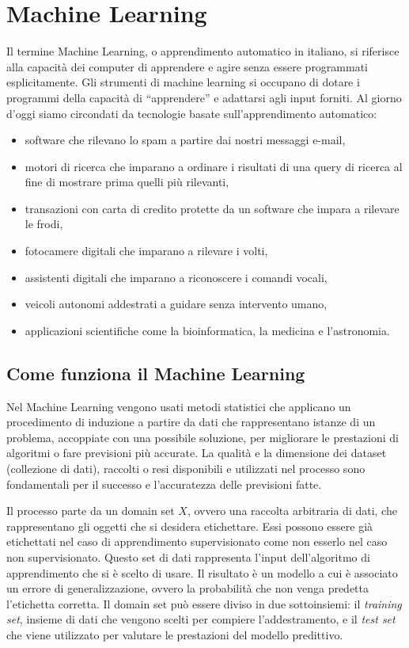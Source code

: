 \documentclass[12pt,italian]{report}
\begin{document}
\chapter{Machine Learning}
Il termine Machine Learning, o apprendimento automatico in italiano, si riferisce alla capacità dei computer di apprendere e agire senza essere programmati esplicitamente.
Gli strumenti di machine learning si occupano di dotare i programmi della capacità di ``apprendere'' e adattarsi agli input forniti.
Al giorno d'oggi siamo circondati da tecnologie basate sull'apprendimento automatico:
\begin{itemize}
	\item software che rilevano lo spam a partire dai nostri messaggi e-mail, 
	\item motori di ricerca che imparano a ordinare i risultati di una query di ricerca al fine di mostrare prima quelli più rilevanti, 
	\item transazioni con carta di credito protette da un software che impara a rilevare le frodi, 
	\item fotocamere digitali che imparano a rilevare i volti, 
	\item assistenti digitali che imparano a riconoscere i comandi vocali, 
	\item veicoli autonomi addestrati a guidare senza intervento umano, 
	\item applicazioni scientifiche come la bioinformatica, la medicina e l'astronomia.
\end{itemize}
\section{Come funziona il Machine Learning}
\label{sec:Come funziona il Machine Learning}
Nel Machine Learning vengono usati metodi statistici che applicano un procedimento di induzione a partire da dati che rappresentano istanze di un problema, accoppiate con una possibile soluzione, per migliorare le prestazioni di algoritmi o fare previsioni più accurate.
La qualità e la dimensione dei dataset (collezione di dati), raccolti o resi disponibili e utilizzati nel processo sono fondamentali per il successo e l'accuratezza delle previsioni fatte.

Il processo parte da un domain set $X$, ovvero una raccolta arbitraria di dati, che rappresentano gli oggetti che si desidera etichettare. Essi possono essere già etichettati nel caso di apprendimento supervisionato come non esserlo nel caso non supervisionato. Questo set di dati rappresenta l'input dell'algoritmo di apprendimento che si è scelto di usare. Il risultato è un modello a cui è associato un errore di generalizzazione, ovvero la probabilità che non venga predetta l'etichetta corretta.
Il domain set può essere diviso in due sottoinsiemi: il \textit{training set}, insieme di dati che vengono scelti per compiere l'addestramento, e il \textit{test set} che viene utilizzato per valutare le prestazioni del modello predittivo.
\end{document}
